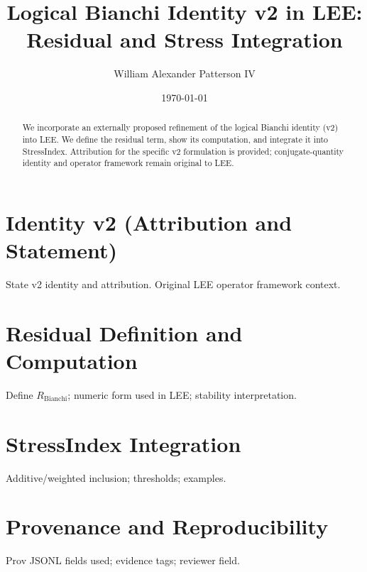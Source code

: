 \documentclass[11pt]{article}
\title{Logical Bianchi Identity v2 in LEE: Residual and Stress Integration}
\author{William Alexander Patterson IV}
\date{\today}
\begin{document}
	\maketitle
	
	\begin{abstract}
		We incorporate an externally proposed refinement of the logical Bianchi identity (v2) into LEE. We define the residual term, show its computation, and integrate it into StressIndex. Attribution for the specific v2 formulation is provided; conjugate-quantity identity and operator framework remain original to LEE.
	\end{abstract}
	
	\section{Identity v2 (Attribution and Statement)}
	State v2 identity and attribution. Original LEE operator framework context.
	
	\section{Residual Definition and Computation}
	Define $R_{\mathrm{Bianchi}}$; numeric form used in LEE; stability interpretation.
	
	\section{StressIndex Integration}
	Additive/weighted inclusion; thresholds; examples.
	
	\section{Provenance and Reproducibility}
	Prov JSONL fields used; evidence tags; reviewer field.
	
	
	
\end{document}
